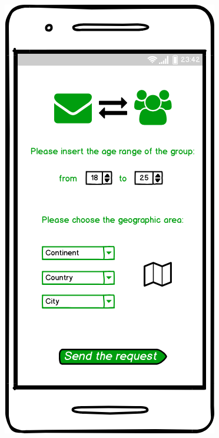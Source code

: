 \documentclass{article}
\begin{document}
\begin{legal}
\begin{legal}
\begin{legal}
\begin{legal}
\begin{figure}[H]
  				\includegraphics[scale=0.3]{./images/mockups/Group-request.png}
				\end{figure}
				
			\end{legal}
			\end{legal}


\end{legal}
\end{legal}
\end{document}
